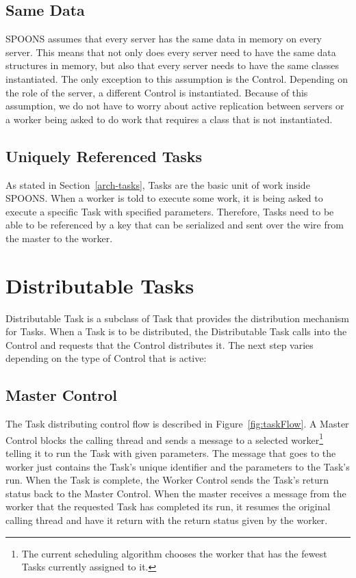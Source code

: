 \documentclass[12pt]{ucthesis}
\begin{document}
\subsection{Same Data}
SPOONS assumes that every server has the same data in memory on every server.
This means that not only does every server need to have the same data structures in memory,
but also that every server needs to have the same classes instantiated. The only exception to this
assumption is the Control. Depending on the role of the server, a different Control is
instantiated. Because of this assumption, we do not have to worry about active replication
between servers or a worker being asked to do work that requires a class that is not instantiated.

\subsection{Uniquely Referenced Tasks}
As stated in Section~\ref{arch-tasks}, Tasks are the basic unit of work inside SPOONS.
When a worker is told to execute some work, it is being asked to execute a specific Task with specified
parameters. Therefore, Tasks need to be able to be referenced by a key that can be serialized and
sent over the wire from the master to the worker.

\section{Distributable Tasks}
\label{arch-dist-tasks}
Distributable Task is a subclass of Task that provides the distribution mechanism for Tasks.
When a Task is to be distributed, the Distributable Task calls into the Control and requests that
the Control distributes it. The next step varies depending on the type of Control that is active:

\subsection{Master Control}
The Task distributing control flow is described in Figure~\ref{fig:taskFlow}.
A Master Control blocks the calling thread and sends a message to a selected worker\footnote{The
current scheduling algorithm chooses the worker that has the fewest Tasks currently assigned to it.} telling it to
run the Task with given parameters. The message that goes to the worker just contains the Task's unique identifier
and the parameters to the Task's run. When the Task is complete, the Worker Control sends the Task's return
status back to the Master Control. When the master receives a message from the worker that the requested Task
has completed its run, it resumes the original calling thread and have it return with the return status given
by the worker.
\end{document}

